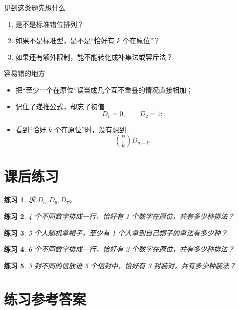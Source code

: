 \documentclass[11pt,a4paper,fontset=fandol]{ctexart}
\theoremstyle{formaltheorem}
\theoremstyle{formalexample}
\newtheorem{exercise}{练习}[section]
\begin{document}
\begin{skillbox}{见到这类题先想什么}
\begin{enumerate}
  \item 是不是标准错位排列？
  \item 如果不是标准型，是不是“恰好有 $k$ 个在原位”？
  \item 如果还有额外限制，能不能转化成补集法或容斥法？
\end{enumerate}
\end{skillbox}

\begin{notebox}{容易错的地方}
\begin{itemize}
  \item 把“至少一个在原位”误当成几个互不重叠的情况直接相加；
  \item 记住了递推公式，却忘了初值
  \[
  D_1=0,\qquad D_2=1;
  \]
  \item 看到“恰好 $k$ 个在原位”时，没有想到
  \[
  \binom{n}{k}D_{n-k}.
  \]
\end{itemize}
\end{notebox}

\section{课后练习}

\begin{exercise}
求 $D_5,D_6,D_7$。
\end{exercise}

\begin{exercise}
4 个不同数字排成一行，恰好有 1 个数字在原位，共有多少种排法？
\end{exercise}

\begin{exercise}
5 个人随机拿帽子，至少有 1 个人拿到自己帽子的拿法有多少种？
\end{exercise}

\begin{exercise}
6 个不同数字排成一行，恰好有 2 个数字在原位，共有多少种排法？
\end{exercise}

\begin{exercise}
5 封不同的信放进 5 个信封中，恰好有 3 封装对，共有多少种装法？
\end{exercise}

\newpage
\appendix
\section{练习参考答案}
\end{document}
